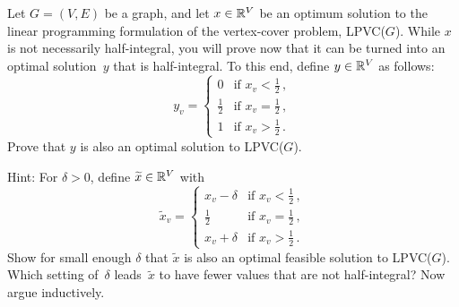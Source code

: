 \documentclass[english]{uebung_cs}
\begin{document}
\begin{exercise}
  Let $G = (V, E)$ be a graph, and let $x \in \mathbb{R}^V$ be an
  optimum solution to the linear programming formulation of the vertex-cover problem, LPVC($G$). While $x$ is not necessarily half-integral, you will prove now that it can be turned into an optimal solution~$y$ that is half-integral. To this end, define
  $y\in\mathbb{R}^V$ as follows:
  \[
    y_v = \begin{cases}
      0           & \text{if } x_v < \frac{1}{2}\,, \\
      \frac{1}{2} & \text{if } x_v = \frac{1}{2}\,, \\
      1           & \text{if } x_v > \frac{1}{2}\,.
    \end{cases}
  \]
  Prove that $y$ is also an optimal solution to LPVC($G$).

  Hint: For $\delta>0$, define $\widetilde x\in\mathbb{R}^V$ with\[
    \widetilde x_v = \begin{cases}
      x_v-\delta  & \text{if } x_v < \frac{1}{2}\,, \\
      \frac{1}{2} & \text{if } x_v = \frac{1}{2}\,, \\
      x_v+\delta  & \text{if } x_v > \frac{1}{2}\,.
    \end{cases}
  \]
  Show for small enough $\delta$ that $\widetilde x$ is also an optimal feasible solution to LPVC($G$). Which setting of~$\delta$ leads~$\widetilde x$ to have fewer values that are not half-integral? Now argue inductively.
\end{exercise}
\end{document}
